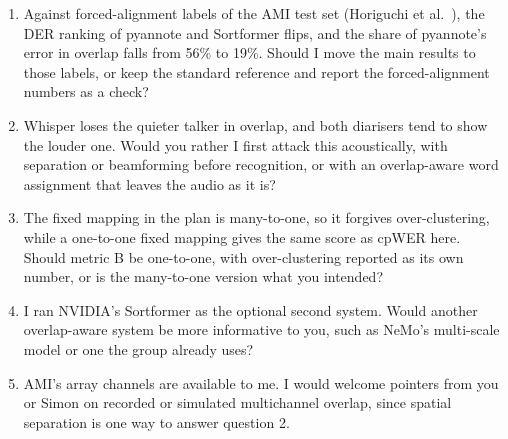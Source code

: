 \documentclass[11pt,a4paper]{article}
\begin{document}
\begin{enumerate}[leftmargin=*, label=\arabic*.]
  \item Against forced-alignment labels of the AMI test set (Horiguchi et al.~\cite{horiguchi}), the DER ranking of pyannote and Sortformer flips, and the share of pyannote's error in overlap falls from 56\% to 19\%. Should I move the main results to those labels, or keep the standard reference and report the forced-alignment numbers as a check?
  \item Whisper loses the quieter talker in overlap, and both diarisers tend to show the louder one. Would you rather I first attack this acoustically, with separation or beamforming before recognition, or with an overlap-aware word assignment that leaves the audio as it is?
  \item The fixed mapping in the plan is many-to-one, so it forgives over-clustering, while a one-to-one fixed mapping gives the same score as cpWER here. Should metric B be one-to-one, with over-clustering reported as its own number, or is the many-to-one version what you intended?
  \item I ran NVIDIA's Sortformer as the optional second system. Would another overlap-aware system be more informative to you, such as NeMo's multi-scale model or one the group already uses?
  \item AMI's array channels are available to me. I would welcome pointers from you or Simon on recorded or simulated multichannel overlap, since spatial separation is one way to answer question 2.
\end{enumerate}
\end{document}
